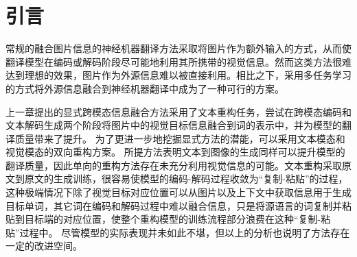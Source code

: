\section{引言}
常规的融合图片信息的神经机器翻译方法采取将图片作为额外输入的方式，从而使翻译模型在编码或解码阶段尽可能地利用其所携带的视觉信息。然而这类方法很难达到理想的效果，图片作为外源信息难以被直接利用。相比之下，采用多任务学习的方式将外源信息融合到神经机器翻译中成为了一种可行的方案。


上一章提出的显式跨模态信息融合方法采用了文本重构任务，尝试在跨模态编码和文本解码生成两个阶段将图片中的视觉目标信息融合到词的表示中，并为模型的翻译质量带来了提升。
为了更进一步地挖掘显式方法的潜能，可以采用文本模态和视觉模态的双向重构方案。
所提方法表明文本到图像的生成同样可以提升模型的翻译质量，因此单向的重构方法存在未充分利用视觉信息的可能。文本重构采取原文到原文的生成训练，很容易使模型的编码-解码过程收敛为“复制-粘贴”的过程，这种极端情况下除了视觉目标对应位置可以从图片以及上下文中获取信息用于生成目标单词，其它词在编码和解码过程中难以融合信息，只是将源语言的词复制并粘贴到目标端的对应位置，使整个重构模型的训练流程部分浪费在这种“复制-粘贴”过程中。
尽管模型的实际表现并未如此不堪，但以上的分析也说明了方法存在一定的改进空间。

